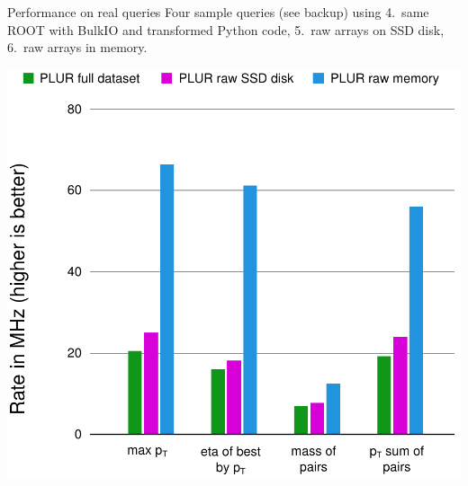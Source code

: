 \documentclass{beamer}
\begin{document}
\begin{frame}{Performance on real queries}
\vspace{0.5 cm}
Four sample queries (see backup) using \textcolor{results4}{4.~same ROOT with BulkIO and transformed Python code}, \textcolor{results5}{5.~raw arrays on SSD disk}, \textcolor{results6}{6.~raw arrays in memory}.

\begin{center}
\includegraphics[width=0.65\linewidth]{physical-media.pdf}
\end{center}
\end{frame}



\end{document}
